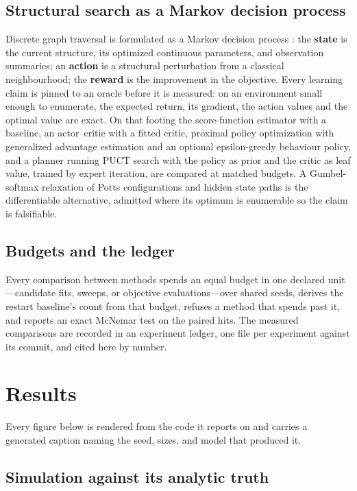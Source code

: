 \documentclass[11pt,a4paper]{article}
\begin{document}
\subsection{Structural search as a Markov decision process}
\label{sec:rl}
Discrete graph traversal is formulated as a Markov decision process
\citep{suttonbarto2018}: the \textbf{state} is the current structure, its
optimized continuous parameters, and observation summaries; an \textbf{action}
is a structural perturbation from a classical neighbourhood; the
\textbf{reward} is the improvement in the objective. Every learning claim is
pinned to an oracle before it is measured: on an environment small enough to
enumerate, the expected return, its gradient, the action values and the optimal
value are exact. On that footing the score-function estimator with a baseline,
an actor--critic with a fitted critic, proximal policy optimization with
generalized advantage estimation and an optional epsilon-greedy behaviour
policy, and a planner running PUCT search with the policy as prior and the
critic as leaf value, trained by expert iteration, are compared at matched
budgets. A Gumbel-softmax relaxation of Potts configurations and hidden state
paths is the differentiable alternative, admitted where its optimum is
enumerable so the claim is falsifiable.

\subsection{Budgets and the ledger}
Every comparison between methods spends an equal budget in one declared
unit---candidate fits, sweeps, or objective evaluations---over shared seeds,
derives the restart baseline's count from that budget, refuses a method that
spends past it, and reports an exact McNemar test on the paired hits. The
measured comparisons are recorded in an experiment ledger, one file per
experiment against its commit, and cited here by number.

\section{Results}
\label{sec:results}

Every figure below is rendered from the code it reports on and carries a
generated caption naming the seed, sizes, and model that produced it.

\subsection{Simulation against its analytic truth}
\label{sec:res-simulation}
\end{document}
